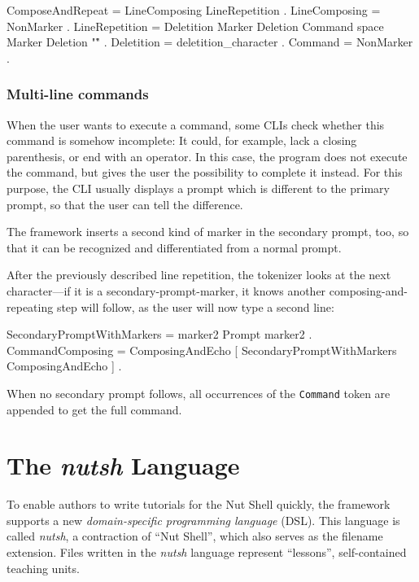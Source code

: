 \documentclass[paper=a4,twoside,abstract=on,cleardoublepage=empty,numbers=noenddot,toc=bib,12pt,appendixprefix=true]{scrreprt}
\begin{document}
\begin{ebnf}
ComposeAndRepeat = LineComposing LineRepetition .
LineComposing = { NonMarker } .
LineRepetition = Deletition Marker Deletion Command
    space Marker Deletion "\r" .
Deletition = { deletition_character } .
Command = { NonMarker } .
\end{ebnf}

\subsection*{Multi-line commands}

When the user wants to execute a command, some \textsc{CLI}s check whether this command is somehow incomplete: It could, for example, lack a closing parenthesis, or end with an operator. In this case, the program does not execute the command, but gives the user the possibility to complete it instead. For this purpose, the CLI usually displays a prompt which is different to the primary prompt, so that the user can tell the difference.

The framework inserts a second kind of marker in the secondary prompt, too, so that it can be recognized and differentiated from a normal prompt.

After the previously described line repetition, the tokenizer looks at the next character---if it is a secondary-prompt-marker, it knows another composing-and-repeating step will follow, as the user will now type a second line:

\begin{ebnf}
SecondaryPromptWithMarkers = marker2 Prompt marker2 .
CommandComposing = ComposingAndEcho
    [ { SecondaryPromptWithMarkers ComposingAndEcho } ] .
\end{ebnf}
%
When no secondary prompt follows, all occurrences of the \texttt{Command} token are appended to get the full command.

\chapter{The \emph{nutsh} Language}
\label{sec:lang}

To enable authors to write tutorials for the Nut Shell quickly, the framework supports a new \emph{domain-specific programming language} (\textsc{DSL}). This language is called \emph{nutsh}, a contraction of “Nut Shell”, which also serves as the filename extension. Files written in the \emph{nutsh} language represent “lessons”, self-contained teaching units.
\end{document}
